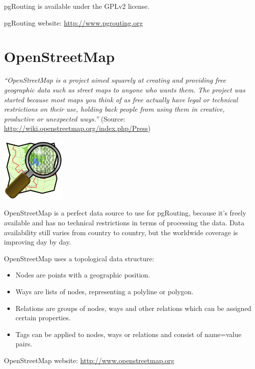 \documentclass[a4paper,10pt,english]{manual}
\begin{document}
pgRouting is available under the GPLv2 license.

pgRouting website: \href{http://www.pgrouting.org}{http://www.pgrouting.org}


\section{OpenStreetMap}

\emph{``OpenStreetMap is a project aimed squarely at creating and providing free geographic data such as street maps to anyone who wants them. The project was started because most maps you think of as free actually have legal or technical restrictions on their use, holding back people from using them in creative, productive or unexpected ways.''} (Source: \href{http://wiki.openstreetmap.org/index.php/Press}{http://wiki.openstreetmap.org/index.php/Press})

{\hfill\includegraphics{osm_logo.png}\hfill}

OpenStreetMap is a perfect data source to use for pgRouting, because it's freely available and has no technical restrictions in terms of processing the data. Data availability still varies from country to country, but the worldwide coverage is improving day by day.

OpenStreetMap uses a topological data structure:
\begin{itemize}
\item {} 
Nodes are points with a geographic position.

\item {} 
Ways are lists of nodes, representing a polyline or polygon.

\item {} 
Relations are groups of nodes, ways and other relations which can be assigned certain properties.

\item {} 
Tags can be applied to nodes, ways or relations and consist of name=value pairs.

\end{itemize}

OpenStreetMap website: \href{http://www.openstreetmap.org}{http://www.openstreetmap.org}
\end{document}
